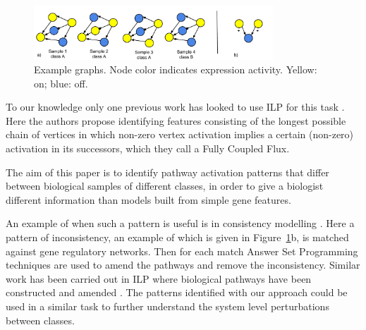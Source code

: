 \documentclass[runningheads,a4paper]{llncs}
\begin{document}
\begin{figure}
\centering
   \includegraphics[width=0.8\textwidth]{graph.pdf}
   \caption{Example graphs. Node color indicates expression activity. Yellow: on; blue: off.}
   \label{fig1}
\end{figure}


To our knowledge only one previous work has looked to use ILP for this task \citep{holec2008using}.
Here the authors propose identifying features consisting of the longest possible chain of vertices in which non-zero vertex activation implies a certain (non-zero) activation in its successors, which they call a Fully Coupled Flux.


The aim of this paper is to identify pathway activation patterns that differ between biological samples of different classes, in order to give a biologist different information than models built from simple gene features.

An example of when such a pattern is useful is in consistency modelling .
Here a pattern of inconsistency, an example of which is given in Figure~\ref{fig1}b, is matched against gene regulatory networks. 
Then for each match Answer Set Programming techniques are used to amend the pathways and remove the inconsistency. Similar work has been carried out in ILP  where biological pathways have been constructed and amended \citep{ray2010automatic}.
The patterns identified with our approach could be used in a similar task to further understand the system level perturbations between classes.



\end{document}
